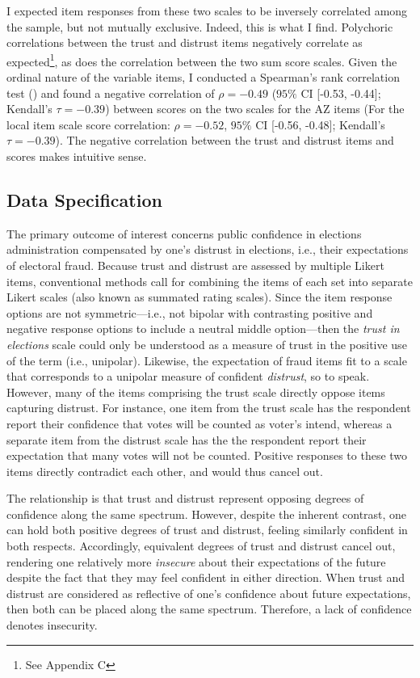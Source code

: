 \documentclass[
  12pt,
  letterpaper,
]{article}
\begin{document}
I expected item responses from these two scales to be inversely
correlated among the sample, but not mutually exclusive. Indeed, this is
what I find. Polychoric correlations between the trust and distrust
items negatively correlate as expected\footnote{See Appendix C}, as does
the correlation between the two sum score scales. Given the ordinal
nature of the variable items, I conducted a Spearman's rank correlation
test () and found a negative
correlation of \(\rho = -0.49\) (\(95\%\) CI {[}-0.53, -0.44{]};
Kendall's \(\tau = -0.39\)) between scores on the two scales for the AZ
items (For the local item scale score correlation: \(\rho = -0.52\),
\(95\%\) CI {[}-0.56, -0.48{]}; Kendall's \(\tau = -0.39\)). The
negative correlation between the trust and distrust items and scores
makes intuitive sense.

\subsection{Data Specification}\label{data-specification}

The primary outcome of interest concerns public confidence in elections
administration compensated by one's distrust in elections, i.e., their
expectations of electoral fraud. Because trust and distrust are assessed
by multiple Likert items, conventional methods call for combining the
items of each set into separate Likert scales (also known as summated
rating scales). Since the item response options are not
symmetric---i.e., not bipolar with contrasting positive and negative
response options to include a neutral middle option---then the
\emph{trust in elections} scale could only be understood as a measure of
trust in the positive use of the term (i.e., unipolar). Likewise, the
expectation of fraud items fit to a scale that corresponds to a unipolar
measure of confident \emph{distrust}, so to speak. However, many of the
items comprising the trust scale directly oppose items capturing
distrust. For instance, one item from the trust scale has the respondent
report their confidence that votes will be counted as voter's intend,
whereas a separate item from the distrust scale has the the respondent
report their expectation that many votes will not be counted. Positive
responses to these two items directly contradict each other, and would
thus cancel out.

The relationship is that trust and distrust represent opposing degrees
of confidence along the same spectrum. However, despite the inherent
contrast, one can hold both positive degrees of trust and distrust,
feeling similarly confident in both respects. Accordingly, equivalent
degrees of trust and distrust cancel out, rendering one relatively more
\emph{insecure} about their expectations of the future despite the fact
that they may feel confident in either direction. When trust and
distrust are considered as reflective of one's confidence about future
expectations, then both can be placed along the same spectrum.
Therefore, a lack of confidence denotes insecurity.
\end{document}
